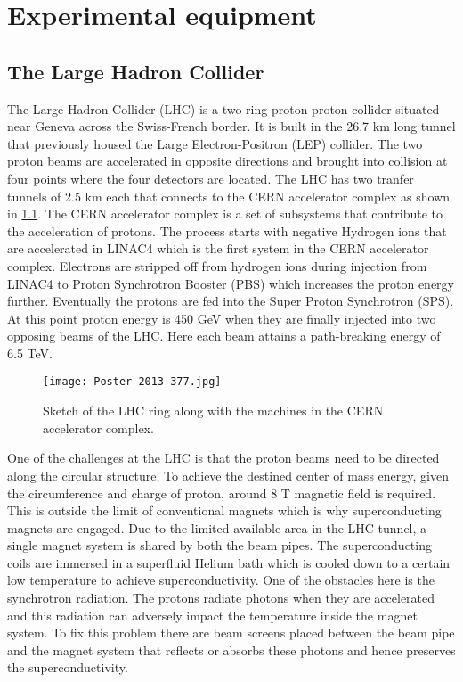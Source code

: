 
\chapter{Experimental equipment}
\label{sec:LHCATLAS}

\section{The Large Hadron Collider}
The Large Hadron Collider (LHC)\cite{LyndonEvans_2008} is a two-ring proton-proton collider situated near Geneva across the Swiss-French border. It is built in 
the 26.7 km long tunnel that previously housed the Large Electron-Positron (LEP) collider. The two proton beams are accelerated in opposite directions and 
brought into collision at four points where the four detectors are located. The LHC has two tranfer tunnels of 2.5 km each that connects to the CERN accelerator
complex as shown in \cref{fig:acc_complex}. The CERN accelerator complex is a set of subsystems that contribute to the acceleration of protons. The process 
starts with negative Hydrogen ions that are accelerated in LINAC4 which is the first system in the CERN accelerator complex. Electrons are stripped off from 
hydrogen ions during injection from LINAC4 to Proton Synchrotron Booster (PBS) which increases the proton energy further. Eventually the protons are fed into 
the Super Proton Synchrotron (SPS). At this point proton energy is 450 GeV when they are finally injected into two opposing beams of the LHC. Here each beam 
attains a path-breaking energy of 6.5 TeV. 

\begin{figure}[htbp]
    \centering
    \texttt{[image: Poster-2013-377.jpg]}
    \caption[Sketch of the CERN accelerator complex]{Sketch of the LHC ring along with the machines in the CERN accelerator complex\cite{Haffner:1621894}.}%
    \label{fig:acc_complex}
\end{figure}


One of the challenges at the LHC is that the proton beams need to be directed along the circular structure. To achieve the destined center of mass energy, 
given the circumference and charge of proton, around 8 T magnetic field is required. This is outside the limit of conventional magnets which is why 
superconducting magnets are engaged. Due to the limited available area in the LHC tunnel, a single magnet system is shared by both the beam pipes. The 
superconducting coils are immersed in a superfluid Helium bath which is cooled down to a certain low temperature to achieve superconductivity. One of the 
obstacles here is the synchrotron radiation. The protons radiate photons when they are accelerated and this radiation can adversely impact the temperature 
inside the magnet system. To fix this problem there are beam screens placed between the beam pipe and the magnet system that reflects or absorbs these photons
and hence preserves the superconductivity. 

